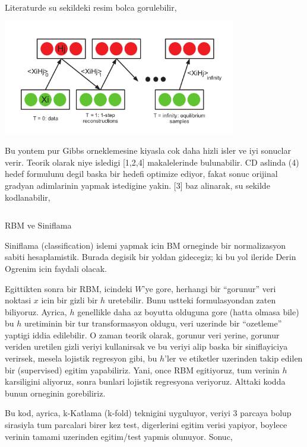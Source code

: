 \documentclass[12pt,fleqn]{article}\usepackage{../common}
\begin{document}
Literaturde su sekildeki resim bolca gorulebilir,

\includegraphics[height=5cm]{rbm_03.png}

Bu yontem pur Gibbs orneklemesine kiyasla cok daha hizli isler ve iyi
sonuclar verir. Teorik olarak niye isledigi [1,2,4] makalelerinde
bulunabilir. CD aslinda (4) hedef formulunu degil baska bir hedefi optimize
ediyor, fakat sonuc orijinal gradyan adimlarinin yapmak istedigine
yakin. [3] baz alinarak, su sekilde kodlanabilir,

\inputminted[fontsize=\footnotesize]{python}{rbm.py}

RBM ve Siniflama 

Siniflama (classification) islemi yapmak icin BM orneginde bir
normalizasyon sabiti hesaplamistik. Burada degisik bir yoldan gidecegiz; ki
bu yol ileride Derin Ogrenim icin faydali olacak. 

Egittikten sonra bir RBM, icindeki $W$'ye gore, herhangi bir ``gorunur''
veri noktasi $x$ icin bir gizli bir $h$ uretebilir. Bunu ustteki
formulasyondan zaten biliyoruz. Ayrica, $h$ genellikle daha az boyutta
olduguna gore (hatta olmasa bile) bu $h$ uretiminin bir tur transformasyon
oldugu, veri uzerinde bir ``ozetleme'' yaptigi iddia edilebilir. O zaman
teorik olarak, gorunur veri yerine, gorunur veriden uretilen gizli veriyi
kullanirsak ve bu veriyi alip baska bir siniflayiciya verirsek, mesela
lojistik regresyon gibi, bu $h$'ler ve etiketler uzerinden takip edilen bir
(supervised) egitim yapabiliriz. Yani, once RBM egitiyoruz, tum verinin $h$
karsiligini aliyoruz, sonra bunlari lojistik regresyona veriyoruz. Alttaki
kodda bunun orneginin gorebiliriz.

Bu kod, ayrica, k-Katlama (k-fold) teknigini uyguluyor, veriyi 3 parcaya
bolup sirasiyla tum parcalari birer kez test, digerlerini egitim verisi
yapiyor, boylece verinin tamami uzerinden egitim/test yapmis
olunuyor. Sonuc,

\inputminted[fontsize=\footnotesize]{python}{test_rbmkfold.py}
\end{document}
